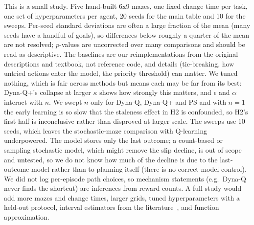 This is a small study. Five hand-built 6x9 mazes, one fixed change time per task, one set of hyperparameters per agent, 20 seeds for the main table and 10 for the sweeps. Per-seed standard deviations are often a large fraction of the mean (many seeds have a handful of goals), so differences below roughly a quarter of the mean are not resolved; $p$-values are uncorrected over many comparisons and should be read as descriptive. The baselines are our reimplementations from the original descriptions and textbook, not reference code, and details (tie-breaking, how untried actions enter the model, the priority threshold) can matter. We tuned nothing, which is fair across methods but means each may be far from its best: Dyna-Q+'s collapse at larger $\kappa$ shows how strongly this matters, and $\epsilon$ and $\alpha$ interact with $n$. We swept $n$ only for Dyna-Q, Dyna-Q+ and PS and with $n=1$ the early learning is so slow that the staleness effect in H2 is confounded, so H2's first half is inconclusive rather than disproved at larger scale. The sweeps use 10 seeds, which leaves the stochastic-maze comparison with Q-learning underpowered. The model stores only the last outcome; a count-based or sampling stochastic model, which might remove the slip decline, is out of scope and untested, so we do not know how much of the decline is due to the last-outcome model rather than to planning itself (there is no correct-model control). We did not log per-episode path choices, so mechanism statements (e.g.\ Dyna-Q never finds the shortcut) are inferences from reward counts. A full study would add more mazes and change times, larger grids, tuned hyperparameters with a held-out protocol, interval estimators from the literature~\cite{agarwal2021deep}, and function approximation.
